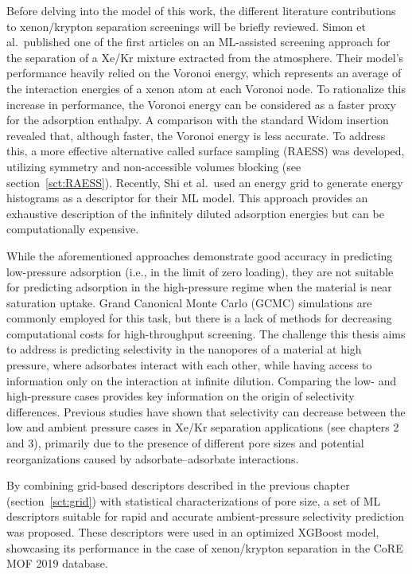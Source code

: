 \documentclass[main]{subfiles}
\begin{document}
Before delving into the model of this work, the different literature contributions to xenon/krypton separation screenings will be briefly reviewed. Simon et al.\ published one of the first articles on an ML-assisted screening approach for the separation of a Xe/Kr mixture extracted from the atmosphere.\autocite{Simon_2015} Their model's performance heavily relied on the Voronoi energy, which represents an average of the interaction energies of a xenon atom at each Voronoi node.\autocite{Rycroft_2009} To rationalize this increase in performance, the Voronoi energy can be considered as a faster proxy for the adsorption enthalpy. A comparison with the standard Widom insertion revealed that, although faster, the Voronoi energy is less accurate. To address this, a more effective alternative called surface sampling (RAESS) was developed, utilizing symmetry and non-accessible volumes blocking (see section~\ref{sct:RAESS}). Recently, Shi et al.\ used an energy grid to generate energy histograms as a descriptor for their ML model. This approach provides an exhaustive description of the infinitely diluted adsorption energies\autocite{Shi_2023} but can be computationally expensive.

While the aforementioned approaches demonstrate good accuracy in predicting low-pressure adsorption (i.e., in the limit of zero loading), they are not suitable for predicting adsorption in the high-pressure regime when the material is near saturation uptake. Grand Canonical Monte Carlo (GCMC) simulations are commonly employed for this task, but there is a lack of methods for decreasing computational costs for high-throughput screening. The challenge this thesis aims to address is predicting selectivity in the nanopores of a material at high pressure, where adsorbates interact with each other, while having access to information only on the interaction at infinite dilution. Comparing the low- and high-pressure cases provides key information on the origin of selectivity differences. Previous studies have shown that selectivity can decrease between the low and ambient pressure cases in Xe/Kr separation applications (see chapters 2 and 3), primarily due to the presence of different pore sizes and potential reorganizations caused by adsorbate--adsorbate interactions.

By combining grid-based descriptors described in the previous chapter (section~\ref{sct:grid}) with statistical characterizations of pore size, a set of ML descriptors suitable for rapid and accurate ambient-pressure selectivity prediction was proposed. These descriptors were used in an optimized XGBoost model, showcasing its performance in the case of xenon/krypton separation in the CoRE MOF 2019 database\autocite{Chung_2019}.
\end{document}

